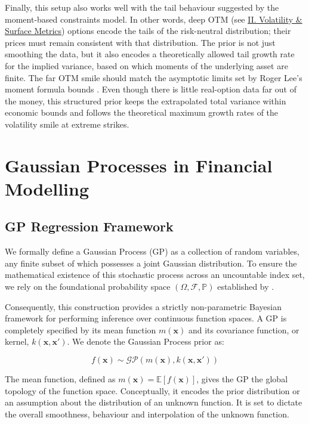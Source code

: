 \documentclass[12pt,oneside]{report}
\theoremstyle{definition}
\theoremstyle{remark}
\begin{document}
Finally, this setup also works well with the tail behaviour suggested by the moment-based constraints model. In other words, deep OTM (see \hyperref[sec:glossary_volatility_surface_metrics]{II. Volatility \& Surface Metrics}) options encode the tails of the risk-neutral distribution; their prices must remain consistent with that distribution. The prior is not just smoothing the data, but it also encodes a theoretically allowed tail growth rate for the implied variance, based on which moments of the underlying asset are finite. The far OTM smile should match the asymptotic limits set by Roger Lee’s moment formula bounds \cite{lee2004moment}. Even though there is little real-option data far out of the money, this structured prior keeps the extrapolated total variance within economic bounds and follows the theoretical maximum growth rates of the volatility smile at extreme strikes.

\chapter{Gaussian Processes in Financial Modelling}

\section{GP Regression Framework}
We formally define a Gaussian Process (GP) as a collection of random variables, any finite subset of which possesses a joint Gaussian distribution. To ensure the mathematical existence of this stochastic process across an uncountable index set, we rely on the foundational probability space $(\Omega, \mathcal{F}, \mathbb{P})$ established by \citet{kolmogorov1933foundations}.

Consequently, this construction provides a strictly non-parametric Bayesian framework for performing inference over continuous function spaces. A GP is completely specified by its mean function $m(\mathbf{x})$ and its covariance function, or kernel, $k(\mathbf{x}, \mathbf{x}')$. We denote the Gaussian Process prior as:

\begin{equation}
f(\mathbf{x}) \sim \mathcal{GP}(m(\mathbf{x}), k(\mathbf{x}, \mathbf{x}'))
\end{equation}

The mean function, defined as $m(\mathbf{x}) = \mathbb{E}[f(\mathbf{x})]$, gives the GP the global topology of the function space. Conceptually, it encodes the prior distribution or an assumption about the distribution of an unknown function. It is set to dictate the overall smoothness, behaviour and interpolation of the unknown function. 
\end{document}
